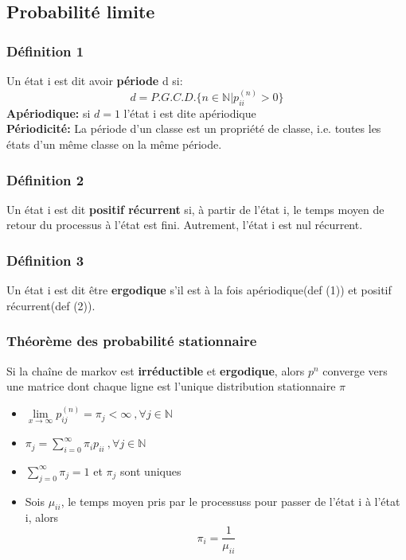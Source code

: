 \documentclass[13pt]{article}
\begin{document}
\subsection*{Probabilité limite}

\subsubsection*{Définition 1}
Un état i est dit avoir \textbf{période} d si:
\[ d = P.G.C.D.\{ n \in \mathbb{N}|p_{ii}^{(n)} > 0 \} \]
\textbf{Apériodique:} si $d=1$ l'état i est dite apériodique\\
\textbf{Périodicité:} La période d'un classe est un propriété de classe, i.e. toutes les états d'un même classe on la même période.

\subsubsection*{Définition 2}
Un état i est dit \textbf{positif récurrent} si, à partir de l'état i, le temps moyen de retour 
du processus à l'état  est fini. Autrement, l'état i est nul récurrent.

\subsubsection*{Définition 3}
Un état i est dit être \textbf{ergodique} s’il est à la fois apériodique(def (1)) et positif récurrent(def (2)).

\subsubsection*{Théorème des probabilité stationnaire}
Si la chaîne de markov est \textbf{irréductible} et \textbf{ergodique}, alors $p^n$ converge vers une matrice dont chaque ligne est l'unique distribution stationnaire $\pi$ 
\begin{itemize}
  \item $\lim\limits_{x \to \infty} p_{ij}^{(n)} = \pi_j < \infty \:,\forall j \in \mathbb{N}$ 
  \item $\pi_j = \sum\limits_{i=0}^\infty \pi_i p_{ii} \:,\forall j \in \mathbb{N}$
  \item $\sum\limits_{j=0}^\infty \pi_j = 1$ et $\pi_j$ sont uniques
  \item Sois $\mu_{ii}$, le temps moyen pris par le processuss pour passer de l'état i à l'état i, alors
  \[ \pi_i = \frac{1}{\mu_{ii}} \]
\end{itemize}
\end{document}
